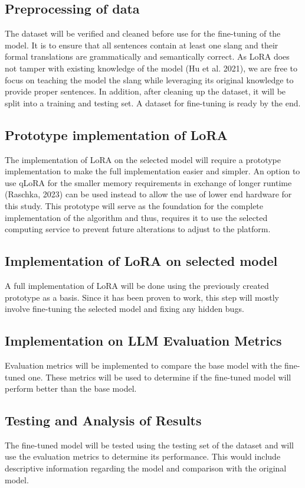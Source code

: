 \subsection{Preprocessing of data} 
The dataset will be verified and cleaned before use for the fine-tuning of the model. It is to ensure that all sentences contain at least one slang and their formal translations are grammatically and semantically correct. As LoRA does not tamper with existing knowledge of the model (Hu et al. 2021), we are free to focus on teaching the model the slang while leveraging its original knowledge to provide proper sentences. In addition, after cleaning up the dataset, it will be split into a training and testing set. A dataset for fine-tuning is ready by the end.

\subsection{Prototype implementation of LoRA}
The implementation of LoRA on the selected model will require a prototype implementation to make the full implementation easier and simpler. An option to use qLoRA for the smaller memory requirements in exchange of longer runtime (Raschka, 2023) can be used instead to allow the use of lower end hardware for this study. This prototype will serve as the foundation for the complete implementation of the algorithm and thus, requires it to use the selected computing service to prevent future alterations to adjust to the platform. 

\subsection{Implementation of LoRA on selected model}
A full implementation of LoRA will be done using the previously created prototype as a basis. Since it has been proven to work, this step will mostly involve fine-tuning the selected model and fixing any hidden bugs.

\subsection{Implementation on LLM Evaluation Metrics}
Evaluation metrics will be implemented to compare the base model with the fine-tuned one. These metrics will be used to determine if the fine-tuned model will perform better than the base model.

\subsection{Testing and Analysis of Results}
The fine-tuned model will be tested using the testing set of the dataset and will use the evaluation metrics to determine its performance. This would include descriptive information regarding the model and comparison with the original model.

